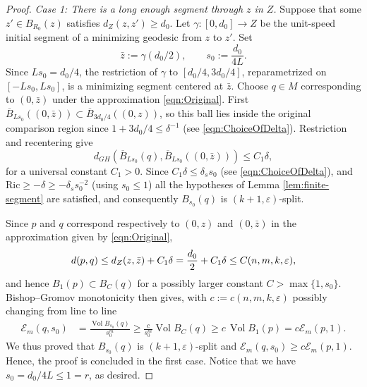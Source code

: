 \documentclass[11pt]{amsart}
\theoremstyle{definition}
\theoremstyle{remark}
\DeclareMathOperator{\Vol}{Vol}
\newcommand{\Ex}{\mathcal E}
\begin{document}
\begin{proof}
\smallskip
\noindent
\emph{Case 1: There is a long enough segment through $z$ in $Z$.}
Suppose that some $z'\in B_{R_0}(z)$ satisfies
$d_Z(z,z')\geq d_0$. Let $\gamma:[0,d_0]\to Z$ be the unit-speed initial segment of a minimizing geodesic from $z$ to $z'$. Set
\[
 \bar z:=\gamma(d_0/2),
 \qquad
 s_0:=\frac{d_0}{4L}.
\]
Since $Ls_0=d_0/4$, the restriction of $\gamma$ to
$[d_0/4,3d_0/4]$, reparametrized on $[-Ls_0,Ls_0]$, is a minimizing
segment centered at $\bar z$. Choose $q\in M$ corresponding to $(0,\bar z)$ under the approximation \eqref{eqn:Original}. First
$ \overline B_{Ls_0}((0,\bar z))
 \subset \overline B_{3d_0/4}((0,z))$,
so this ball lies inside the original comparison region since $1+3d_0/4\le \delta^{-1}$ (see \eqref{eqn:ChoiceOfDelta}). Restriction
and recentering give
\[
 d_{GH}\!\left(
 \overline B_{Ls_0}(q),
 \overline B_{Ls_0}((0,\bar z))
 \right)
 \leq C_1\delta,
\]
for a universal constant $C_1>0$.
Since
 $C_{1}\delta\leq\delta_s s_0$ (see \eqref{eqn:ChoiceOfDelta}), and $\mathrm{Ric}\geq -\delta\geq -\delta_ss_0^{-2}$ (using $s_0\leq 1$) all the hypotheses of Lemma \ref{lem:finite-segment} are
satisfied, and consequently $B_{s_0}(q)$ is
$(k+1,\varepsilon)$-split.

Since $p$ and $q$ correspond respectively to $(0,z)$ and
$(0,\bar z)$ in the approximation given by \eqref{eqn:Original},
\[
 d(p,q)\leq d_Z(z,\bar z)+C_{\rm 1}\delta
          =\frac{d_0}{2}+C_{\rm 1}\delta
          \leq C(n,m,k,\varepsilon),
\] 
and hence $B_1(p)\subset B_{C}(q)$ for a possibly larger constant $C>\max\{1,s_0\}$.
Bishop--Gromov monotonicity then gives, with $c:=c(n,m,k,\varepsilon)$ possibly changing from line to line
\[
 \begin{split}
 \Ex_m(q,s_0)
 &=\frac{\Vol B_{s_0}(q)}{s_0^m}
 \geq \frac{c}{s_0^m}\Vol B_C(q)
 \geq c\,\Vol B_1(p)
 =c\Ex_m(p,1).
 \end{split}
\]
We thus proved that $B_{s_0}(q)$ is $(k+1,\varepsilon)$-split and $\Ex_m(q,s_0)\geq c\Ex_m(p,1)$. Hence, the proof is concluded in the first case. Notice that we have $s_0=d_0/4L\leq 1=r$, as desired.


\end{proof}
\end{document}

